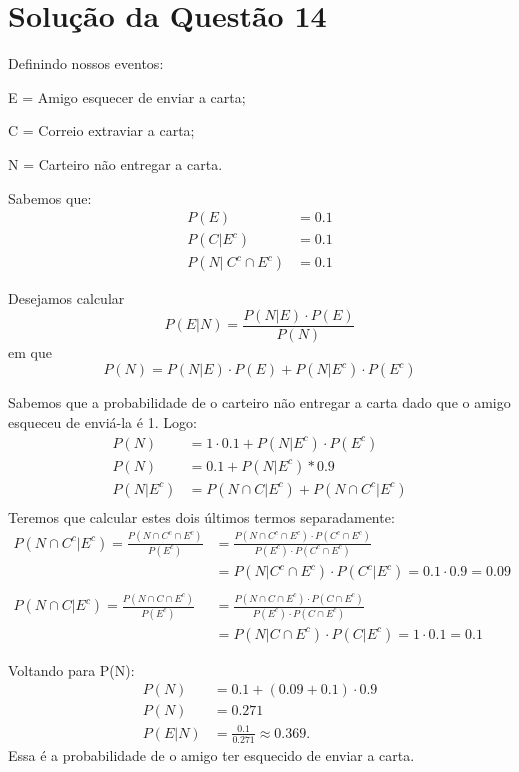 \documentclass[
	12pt,				%
	openright,			%
	twoside,			%
	a4paper,			%
	english,			%
	french,				%
	spanish,			%
	brazil,				%
	]{abntex2}
\begin{document}
\section{Solução da Questão 14}

Definindo nossos eventos:

E = Amigo esquecer de enviar a carta;

C = Correio extraviar a carta;

N = Carteiro não entregar a carta.

Sabemos que:
\begin{align*}
    P(E) &= 0.1\\
    P(C|E^c) &= 0.1\\
    P(N |\ C^c\cap E^c) &= 0.1
\end{align*}

Desejamos calcular
$$P(E|N) = \frac{P(N|E)\cdot P(E)}{P(N)}$$
em que
$$P(N) = P(N|E)\cdot P(E) + P(N|E^c)\cdot P(E^c)$$

Sabemos que a probabilidade de o carteiro não entregar a carta dado que o amigo esqueceu de enviá-la é 1. Logo:
\begin{align*}
    P(N) &= 1\cdot 0.1 + P(N|E^c)\cdot P(E^c)\\
    P(N) &= 0.1 + P(N|E^c) * 0.9\\
    P(N|E^c) &= P(N\cap C|E^c) + P(N\cap C^c|E^c)\\
\end{align*}
Teremos que calcular estes dois últimos termos separadamente:
\begin{align*}
    P(N\cap C^c|E^c) = \frac{P(N\cap C^c\cap E^c)}{P(E^c)} &= \frac{P(N\cap C^c\cap E^c)\cdot P(C^c\cap E^c)}{P(E^c)\cdot P(C^c\cap E^c)}\\
    &= P(N|C^c\cap E^c)\cdot P(C^c|E^c) = 0.1\cdot 0.9 = 0.09\\\\
    P(N\cap C|E^c) = \frac{P(N\cap C\cap E^c)}{P(E^c)} &=  \frac{P(N\cap C\cap E^c)\cdot P(C\cap E^c)}{P(E^c)\cdot P(C\cap E^c)}\\
    &= P(N|C\cap E^c)\cdot P(C|E^c) = 1\cdot 0.1 = 0.1
\end{align*}

Voltando para P(N):
\begin{align*}
    P(N) &= 0.1 + (0.09 + 0.1)\cdot 0.9\\
    P(N) &= 0.271\\
    P(E|N) &= \frac{0.1}{0.271} \approx 0.369.
\end{align*}
Essa é a probabilidade de o amigo ter esquecido de enviar a carta.
\end{document}
